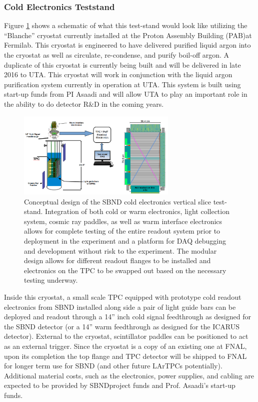 \subsubsection{Cold Electronics Teststand}\label{sec:SBNDTeststand}
Figure \ref{fig:teststand} shows a schematic of what this test-stand would look like utilizing the ``Blanche'' cryostat currently installed at the Proton Assembly Building (PAB)at Fermilab. This cryostat is engineered to have delivered purified liquid argon into the cryostat as well as circulate, re-condense, and purify boil-off argon. A duplicate of this cryostat is currently being built and will be delivered in late 2016 to UTA. This cryostat will work in conjunction with the liquid argon purification system currently in operation at UTA. This system is built using start-up funds from PI Asaadi and will allow UTA to play an important role in the ability to do detector R$\&$D in the coming years. 

\begin{figure}[htb]
\centering
\includegraphics[width=0.68\textwidth]{images/teststand3.png}
\caption[]{Conceptual design of the SBND cold electronics vertical slice test-stand. Integration of both cold or warm electronics, light collection system, cosmic ray paddles, as well as warm interface electronics allows for complete testing of the entire readout system prior to deployment in the experiment and a platform for DAQ debugging and development without risk to the experiment. The modular design allows for different readout flanges to be installed and electronics on the TPC to be swapped out based on the necessary testing underway.}
\label{fig:teststand}
\end{figure} 

Inside this cryostat, a small scale TPC equipped with prototype cold readout electronics from SBND installed along side a pair of light guide bars can be deployed and readout through a 14'' inch cold signal feedthrough as designed for the SBND detector (or a 14'' warm feedthrough as designed for the ICARUS detector). External to the cryostat, scintillator paddles can be positioned to act as an external trigger. Since the cryostat is a copy of an existing one at FNAL, upon its completion the top flange and TPC detector will be shipped to FNAL for longer term use for SBND (and other future LArTPCs potentially). Additional material costs, such as the electronics, power supplies, and cabling are expected to be provided by SBNDproject funds and Prof. Asaadi's start-up funds.

